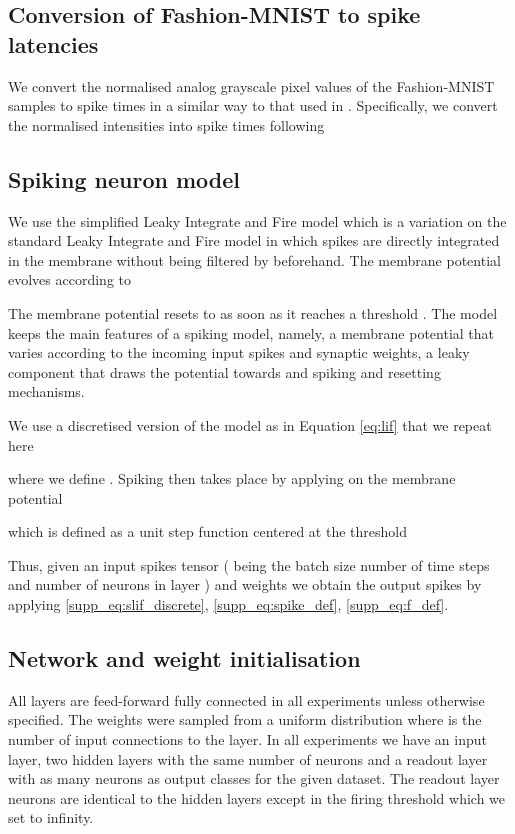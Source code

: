 \documentclass{article}
\begin{document}
\subsection{Conversion of Fashion-MNIST to spike latencies}

We convert the normalised analog grayscale pixel values  of the Fashion-MNIST samples \cite{xiao2017fashion} to spike times in a similar way to that used in \cite{zenke2021remarkable}. Specifically, we convert the normalised intensities into spike times following



\subsection{Spiking neuron model}

We use the simplified Leaky Integrate and Fire model which is a variation on the standard Leaky Integrate and Fire model in which spikes are directly integrated in the membrane without being filtered by beforehand. The membrane potential evolves according to


The membrane potential resets to  as soon as it reaches a threshold . The model keeps the main features of a spiking model, namely, a membrane potential that varies according to the incoming input spikes and synaptic weights, a leaky component that draws the potential towards  and spiking and resetting mechanisms. 

We use a discretised version of the model as in Equation \eqref{eq:lif} that we repeat here



where we define . Spiking then takes place by applying  on the membrane potential



which is defined as a unit step function centered at the threshold 



Thus, given an input spikes tensor  ( being the batch size  number of time steps and  number of neurons in layer ) and weights  we obtain the output spikes  by applying \eqref{supp_eq:slif_discrete}, \eqref{supp_eq:spike_def}, \eqref{supp_eq:f_def}.

\subsection{Network and weight initialisation}
All layers are feed-forward fully connected in all experiments unless otherwise specified.  The weights were sampled from a uniform distribution  where  is the number of input connections to the layer. In all experiments we have an input layer, two hidden layers with the same number of neurons and a readout layer with as many neurons as output classes for the given dataset. The readout layer neurons are identical to the hidden layers except in the firing threshold which we set to infinity.
\end{document}

